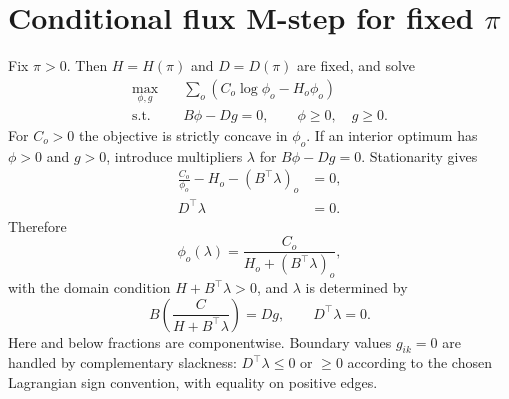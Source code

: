 \documentclass[10pt]{article}
\begin{document}
\section{Conditional flux M-step for fixed $\pi$}
Fix $\pi>0$.  Then $H=H(\pi)$ and $D=D(\pi)$ are fixed, and solve
\begin{equation}\label{eq:condM}
\begin{aligned}
\max_{\phi,g}\quad &\sum_o(C_o\log\phi_o-H_o\phi_o)\\
\text{s.t.}\quad &B\phi-Dg=0,
\qquad \phi\ge0,\quad g\ge0.
\end{aligned}
\end{equation}
For $C_o>0$ the objective is strictly concave in $\phi_o$.  If an interior optimum has $\phi>0$ and $g>0$, introduce multipliers $\lambda$ for $B\phi-Dg=0$.  Stationarity gives
\begin{align}
\frac{C_o}{\phi_o}-H_o-(B^\top\lambda)_o&=0,\label{eq:phikkt}\\
D^\top\lambda&=0.\label{eq:gkkt}
\end{align}
Therefore
\begin{equation}\label{eq:rational}
\boxed{\displaystyle \phi_o(\lambda)=\frac{C_o}{H_o+(B^\top\lambda)_o}},
\end{equation}
with the domain condition $H+B^\top\lambda>0$, and $\lambda$ is determined by
\begin{equation}\label{eq:dualsystem}
B\left(\frac{C}{H+B^\top\lambda}\right)=Dg,
\qquad D^\top\lambda=0.
\end{equation}
Here and below fractions are componentwise.  Boundary values $g_{ik}=0$ are handled by complementary slackness: $D^\top\lambda\le0$ or $\ge0$ according to the chosen Lagrangian sign convention, with equality on positive edges.
\end{document}
